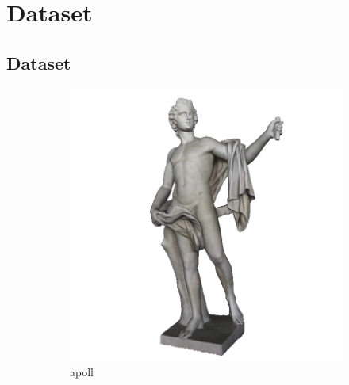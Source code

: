 
\chapter{Dataset} %

\label{AppendixA} %


\section{Dataset}

\begin{figure}[!h]
	\centering
	\begin{subfigure}[b]{0.23\linewidth}
		\includegraphics[width=\linewidth]{./Figures/train-dataset/00.apoll.png}
		\caption{apoll}
	\end{subfigure}
	\begin{subfigure}[b]{0.23\linewidth}

\end{subfigure}
\end{figure}
